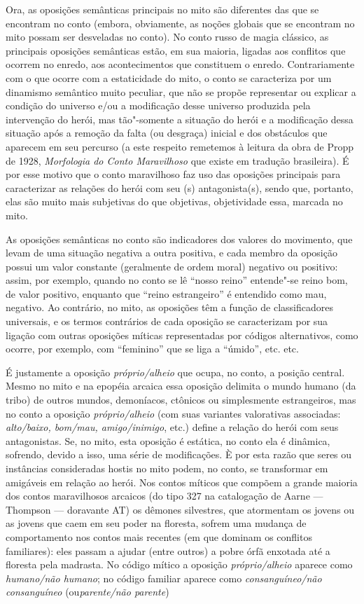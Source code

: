 Ora, as oposições semânticas principais no mito são diferentes das que
se encontram no conto (embora, obviamente, as noções globais que se
encontram no mito possam ser desveladas no conto). No conto russo de
magia clássico, as principais oposições semânticas estão, em sua
maioria, ligadas aos conflitos que ocorrem no enredo, aos
acontecimentos que constituem o enredo. Contrariamente com o que ocorre
com a estaticidade do mito, o conto se caracteriza por um dinamismo
semântico muito peculiar, que não se propõe representar ou explicar a
condição do universo e/ou a modificação desse universo produzida pela
intervenção do herói, mas tão"-somente a situação do herói e a
modificação dessa situação após a remoção da falta (ou desgraça)
inicial e dos obstáculos que aparecem em seu percurso (a este respeito
remetemos à leitura da obra de Propp de 1928, \emph{Morfologia do Conto
Maravilhoso} que existe em tradução brasileira). É por esse motivo que o
conto maravilhoso faz uso das oposições principais para caracterizar as
relações do herói com seu (s) antagonista(s), sendo que, portanto, elas
são muito mais subjetivas do que objetivas, objetividade essa, marcada
no mito.

As oposições semânticas no conto são indicadores dos valores do
movimento, que levam de uma situação negativa a outra positiva, e cada
membro da oposição possui um valor constante (geralmente de ordem
moral) negativo ou positivo: assim, por exemplo, quando no conto se lê ``nosso reino'' entende"-se reino bom, de valor positivo, enquanto que ``reino estrangeiro'' é entendido como mau, negativo. Ao contrário, no
mito, as oposições têm a função de classificadores universais, e os
termos contrários de cada oposição se caracterizam por sua ligação com
outras oposições míticas representadas por códigos alternativos, como
ocorre, por exemplo, com ``feminino'' que se liga a ``úmido'', etc.
etc.

É justamente a oposição \emph{próprio/alheio} que ocupa, no conto, a
posição central. Mesmo no mito e na epopéia arcaica essa oposição
delimita o mundo humano (da tribo) de outros mundos, demoníacos,
ctônicos ou simplesmente estrangeiros, mas no conto a
oposição \emph{próprio/alheio} (com suas variantes valorativas
associadas: \emph{alto/baixo, bom/mau,
amigo/inimigo}, etc.) define a relação do herói com seus
antagonistas. Se, no mito, esta oposição é estática, no conto ela é
dinâmica, sofrendo, devido a isso, uma série de modificações. È por esta
razão que seres ou instâncias consideradas hostis no mito podem, no
conto, se transformar em amigáveis em relação ao herói. Nos contos
míticos que compõem a grande maioria dos contos maravilhosos arcaicos
(do tipo 327 na catalogação de Aarne --- Thompson --- doravante AT) os
dêmones silvestres, que atormentam os jovens ou as jovens que caem em
seu poder na floresta, sofrem uma mudança de comportamento nos contos
mais recentes (em que dominam os conflitos familiares): eles passam a
ajudar (entre outros) a pobre órfã enxotada até a floresta pela
madrasta. No código mítico a oposição \emph{próprio/alheio} aparece
como \emph{humano/não humano}; no código familiar aparece
como \emph{consanguíneo/não consanguíneo} (ou\emph{parente/não
parente})

